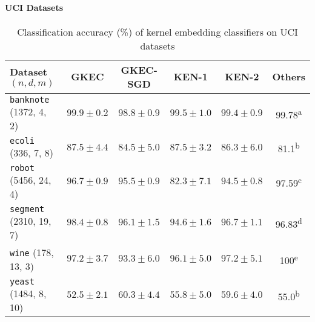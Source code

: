\documentclass{article}
\begin{document}
	\paragraph{UCI Datasets}
	
		\begin{table}[t]
			\caption{Classification accuracy (\%) of kernel embedding classifiers on UCI datasets}
			\label{tab:uci_experiments}
			\centering
			\begin{tabular}{lccccc}			
				Dataset \hspace{\fill} $(n, d, m)$ & GKEC & GKEC-SGD & KEN-1 & KEN-2 & Others \\
				\midrule
				\texttt{banknote} \hspace{\fill} (1372, 4, 2) & $99.9 \pm 0.2$ & $98.8 \pm 0.9$ & $99.5 \pm 1.0$ & $99.4 \pm 0.9$ & 99.78\textsuperscript{a} \\
				\texttt{ecoli} \hspace{\fill} (336, 7, 8) & $87.5 \pm 4.4$ & $84.5 \pm 5.0$ & $87.5 \pm 3.2$ & $86.3 \pm 6.0$ & 81.1\textsuperscript{b} \\
				\texttt{robot} \hspace{\fill} (5456, 24, 4) & $96.7 \pm 0.9$ & $95.5 \pm 0.9$ & $82.3 \pm 7.1$ & $94.5 \pm 0.8$ & 97.59\textsuperscript{c} \\
				\texttt{segment} \hspace{\fill} (2310, 19, 7) & $98.4 \pm 0.8$ & $96.1 \pm 1.5$ & $94.6 \pm 1.6$ & $96.7 \pm 1.1$ & 96.83\textsuperscript{d} \\
				\texttt{wine} \hspace{\fill} (178, 13, 3) & $97.2 \pm 3.7$ & $93.3 \pm 6.0$ & $96.1 \pm 5.0$ & $97.2 \pm 5.1$ & 100\textsuperscript{e} \\
				\texttt{yeast} \hspace{\fill} (1484, 8, 10) & $52.5 \pm 2.1$ & $60.3 \pm 4.4$ & $55.8 \pm 5.0$ & $59.6 \pm 4.0$ & 55.0\textsuperscript{b} \\
			\end{tabular}
		\end{table}
		
\end{document}
